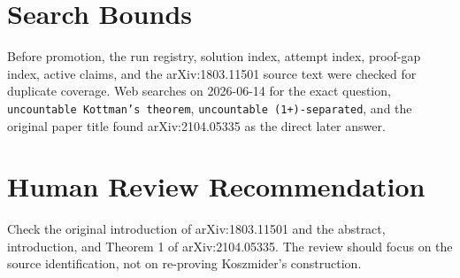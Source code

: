 \documentclass[11pt]{article}
\begin{document}
\section*{Search Bounds}

Before promotion, the run registry, solution index, attempt index, proof-gap
index, active claims, and the arXiv:1803.11501 source text were checked for
duplicate coverage.  Web searches on 2026-06-14 for the exact question,
\texttt{uncountable Kottman's theorem}, \texttt{uncountable (1+)-separated},
and the original paper title found arXiv:2104.05335 as the direct later answer.

\section*{Human Review Recommendation}

Check the original introduction of arXiv:1803.11501 and the abstract,
introduction, and Theorem 1 of arXiv:2104.05335.  The review should focus on
the source identification, not on re-proving Koszmider's construction.
\end{document}
